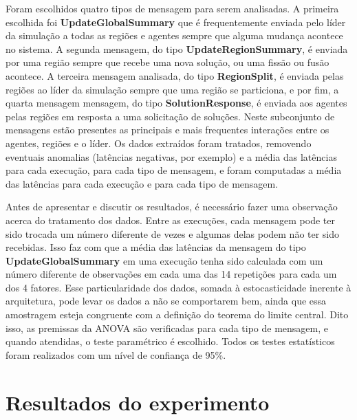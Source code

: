 Foram escolhidos quatro tipos de mensagem para serem analisadas. A primeira escolhida foi \textbf{UpdateGlobalSummary} que é frequentemente enviada pelo líder da simulação a todas as regiões e agentes sempre que alguma mudança acontece no sistema. A segunda mensagem, do tipo \textbf{UpdateRegionSummary}, é enviada por uma região sempre que recebe uma nova solução, ou uma fissão ou fusão acontece. A terceira mensagem analisada, do tipo \textbf{RegionSplit}, é enviada pelas regiões ao líder da simulação sempre que uma região se particiona, e por fim, a quarta mensagem mensagem, do tipo \textbf{SolutionResponse}, é enviada aos agentes pelas regiões em resposta a uma solicitação de soluções. Neste subconjunto de mensagens  estão presentes as principais e mais frequentes interações entre os agentes, regiões e o líder. Os dados extraídos foram tratados, removendo eventuais anomalias (latências negativas, por exemplo) e a média das latências para cada execução, para cada tipo de mensagem, e foram computadas a média das latências para cada execução e para cada tipo de mensagem. 

Antes de apresentar e discutir os resultados, é necessário fazer uma observação acerca do tratamento dos dados. Entre as execuções, cada mensagem pode ter sido trocada um número diferente de vezes e algumas delas podem não ter sido recebidas. Isso faz com que a média das latências da mensagem do tipo \textbf{UpdateGlobalSummary} em uma execução tenha sido calculada com um número diferente de observações em cada uma das 14 repetições para cada um dos 4 fatores. Esse particularidade dos dados, somada à estocasticidade inerente à arquitetura, pode levar os dados a não se comportarem bem, ainda que essa amostragem esteja congruente com a definição do teorema do limite central. Dito isso, as premissas da ANOVA são verificadas para cada tipo de mensagem, e quando atendidas, o teste paramétrico é escolhido. Todos os testes estatísticos foram realizados com um nível de confiança de 95\%.


\section{Resultados do experimento}
\label{sec:resultado}


